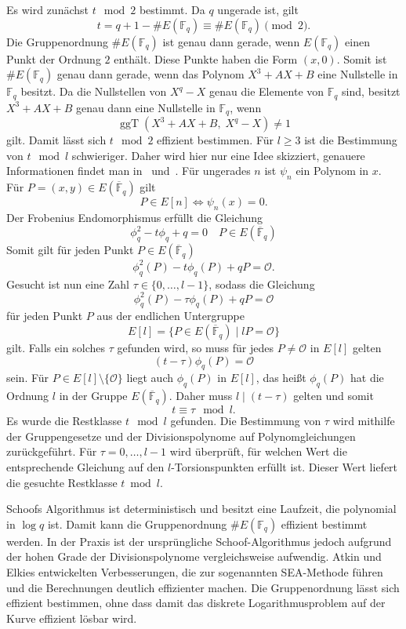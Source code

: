 Es wird zunächst $t\mod 2$ bestimmt. Da $q$ ungerade ist, gilt
\[
    t=q+1-\#E(\mathbb F_q)
    \equiv \#E(\mathbb F_q)\pmod 2.
\]
Die Gruppenordnung $\#E(\mathbb F_q)$ ist genau dann gerade, wenn
$E(\mathbb F_q)$ einen Punkt der Ordnung $2$ enthält. Diese Punkte
haben die Form $(x,0)$. Somit ist $\#E(\mathbb F_q)$ genau dann gerade,
wenn das Polynom \(X^3+AX+B\) eine Nullstelle in $\mathbb F_q$ besitzt. Da die Nullstellen von $X^q-X$ genau die Elemente von $\mathbb F_q$ sind, besitzt $X^3+AX+B$ genau dann eine Nullstelle in $\mathbb F_q$, wenn
\[
    \operatorname{ggT}
    (X^3+AX+B,\;X^q-X)\neq 1
\]
gilt. Damit lässt sich $t\mod 2$ effizient bestimmen.
Für $l\geq 3$ ist die Bestimmung von $t\mod l$ schwieriger. Daher wird hier nur eine Idee skizziert, genauere Informationen findet man in~\cite{schoof95} und~\cite{schoof85}. Für ungerades $n$ ist $\psi_n$ ein Polynom in $x$. Für $P=(x,y)\in E(\overline{\mathbb{F}}_q)$ gilt
\[
    P\in E[n] \iff \psi_n(x)=0.
\]
Der Frobenius Endomorphismus erfüllt die Gleichung
\[
    \phi_q^2-t\phi_q+q=0 \quad P\in E(\overline{\mathbb{F}}_q)
\]
Somit gilt für jeden Punkt
$P\in E(\overline{\mathbb F}_q)$
\[
    \phi_q^2(P)-t\phi_q(P)+qP=\mathcal O.
\]
Gesucht ist nun eine Zahl $\tau\in\{0,\dots,l-1\}$, sodass die Gleichung
\[
    \phi_q^2(P)-\tau\phi_q(P)+qP=\mathcal{O}
\]
für jeden Punkt $P$ aus der endlichen Untergruppe
\[
    E[l]=\{P\in E(\overline{\mathbb{F}}_q)\mid lP=\mathcal{O}\}
\]
gilt. Falls ein solches \(\tau\) gefunden wird, so muss für jedes $P\neq\mathcal{O}$ in $E[l]$ gelten
\[
    (t-\tau)\phi_q(P)=\mathcal{O}
\]
sein. Für $P\in E[l]\setminus\{\mathcal O\}$ liegt auch
$\phi_q(P)$ in $E[l]$, das heißt $\phi_q(P)$ hat die Ordnung $l$ in der Gruppe $E(\overline{\mathbb{F}}_q)$. Daher muss $l\mid(t-\tau)$ gelten und somit
\[
    t\equiv \tau \mod l.
\]
Es wurde die Restklasse $t\mod l$ gefunden.
Die Bestimmung von $\tau$ wird mithilfe der Gruppengesetze und der
Divisionspolynome auf Polynomgleichungen zurückgeführt. Für
$\tau=0,\dots,l-1$ wird überprüft, für welchen Wert die entsprechende
Gleichung auf den $l$-Torsionspunkten erfüllt ist. Dieser Wert liefert
die gesuchte Restklasse $t\bmod l$.

Schoofs Algorithmus ist deterministisch und besitzt eine Laufzeit,
die polynomial in $\log q$ ist. Damit kann die Gruppenordnung
$\#E(\mathbb F_q)$ effizient bestimmt werden.
In der Praxis ist der ursprüngliche Schoof-Algorithmus jedoch aufgrund
der hohen Grade der Divisionspolynome vergleichsweise aufwendig.
Atkin und Elkies entwickelten Verbesserungen, die zur sogenannten
SEA-Methode führen und die Berechnungen deutlich effizienter machen.
Die Gruppenordnung lässt sich effizient bestimmen, ohne dass damit das diskrete Logarithmusproblem auf der Kurve effizient lösbar wird.

